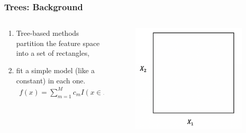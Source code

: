 \documentclass[
  shownotes,
  xcolor={svgnames},
  hyperref={colorlinks,citecolor=DarkBlue,linkcolor=DarkRed,urlcolor=DarkBlue}
  ]{beamer}
\begin{document}
\begin{frame}[fragile]
\frametitle{Trees: Background}


\begin{columns}[T] %
\begin{column}{.42\textwidth}
  
\begin{enumerate}
\item Tree-based methods partition the feature space into a set of rectangles,
\item  fit a simple model (like a constant) in each one. 
\begin{align}
f(x) = \sum_{m=1}^M c_m I(x\in R_m)
\end{align}
\end{enumerate}


\end{column}  
\hfill
\begin{column}{.48\textwidth}

 \begin{figure}[H] \centering
            \captionsetup{justification=centering}
              \includegraphics[scale=0.4]{figures/cart_1}                           
 \end{figure}

\end{column}
\end{columns}

\end{frame}
\end{document}
